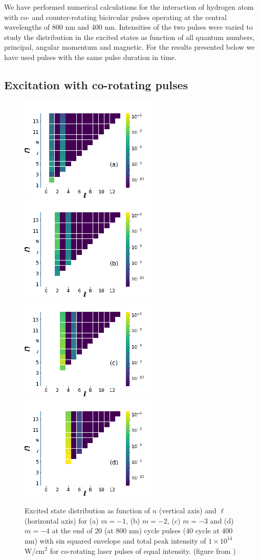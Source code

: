 
We have performed numerical calculations for the interaction of hydrogen atom with co- and counter-rotating bicircular pulses operating at the central wavelengths of 800 nm and 400 nm. Intensities of the two pulses were varied to study the distribution in the excited states as function of all quantum numbers, principal, angular momentum and magnetic. For the results presented below we have used pulses with the same pulse duration in time.  



\subsection{Excitation with co-rotating pulses}

\begin{figure}[!ht]
\centering
\includegraphics[width=0.24\columnwidth]{figs/Rydberg/Gebre-bicircular-Fig1a.png}
\includegraphics[width=0.24\columnwidth]{figs/Rydberg/Gebre-bicircular-Fig1b.png}
\includegraphics[width=0.24\columnwidth]{figs/Rydberg/Gebre-bicircular-Fig1c.png}
\includegraphics[width=0.24\columnwidth]{figs/Rydberg/Gebre-bicircular-Fig1d.png}
\caption{\label{fig:co-nl-distribution}
Excited state distribution as function of $n$ (vertical axis) and $\ell$ (horizontal axis) for (a) $m = -1$, (b) $m=-2$, (c) $m=-3$ and (d) $m=-4$ at the end of 20 (at 800 nm) cycle pulses (40 cycle at 400 nm) with sin squared envelope and total peak intensity of $1\times10^{14}$ W/cm$^2$ for co-rotating laser pulses of equal intensity. (figure from \cite{venzke2020_ryd})
}
\end{figure}

